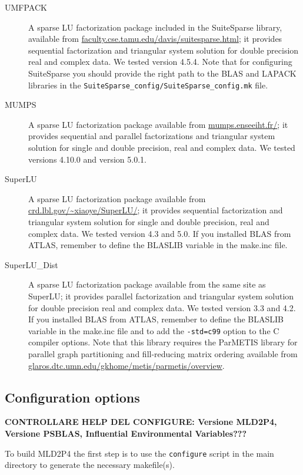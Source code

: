 \begin{description}
\item[UMFPACK] \cite{UMFPACK}
  A sparse LU factorization package included in the SuiteSparse library, available from 
  \url{faculty.cse.tamu.edu/davis/suitesparse.html}; 
  it provides sequential factorization and triangular system solution for double
  precision real and complex data. We tested
  version 4.5.4. Note that for configuring SuiteSparse you should provide the right
path to the BLAS and LAPACK libraries in the \verb|SuiteSparse_config/SuiteSparse_config.mk| file.
\item[MUMPS] \cite{MUMPS}
  A sparse LU factorization package available from \url{mumps.enseeiht.fr/};
  it provides sequential and parallel factorizations and triangular system solution
  for single and double precision, real and complex data.
  We tested versions 4.10.0 and version 5.0.1.
\item[SuperLU] \cite{SUPERLU}
  A sparse LU factorization package available from
  \url{crd.lbl.gov/~xiaoye/SuperLU/}; it provides sequential
  factorization and triangular system solution for single and double precision,
  real and complex data. We tested version 4.3 and 5.0. If you installed BLAS from
ATLAS, remember to define the BLASLIB variable in the make.inc file.
 \item[SuperLU\_Dist] \cite{SUPERLUDIST}
   A sparse LU factorization package available
   from the same site as SuperLU; it provides parallel factorization and
   triangular system solution for double precision real and complex data.
   We tested version 3.3 and 4.2. If you installed BLAS from
ATLAS, remember to define the BLASLIB variable in the make.inc file and
to add the \verb|-std=c99| option to the C compiler options.
Note that this library requires the ParMETIS
library for parallel graph partitioning and fill-reducing matrix ordering available from
\url{glaros.dtc.umn.edu/gkhome/metis/parmetis/overview}.

\end{description}
\subsection{Configuration options}

{\bf CONTROLLARE HELP DEL CONFIGURE: Versione MLD2P4, Versione PSBLAS, Influential Environmental Variables???}

To build  MLD2P4 the first step is to use the \verb|configure| script
in the main directory to generate the necessary makefile(s). 

